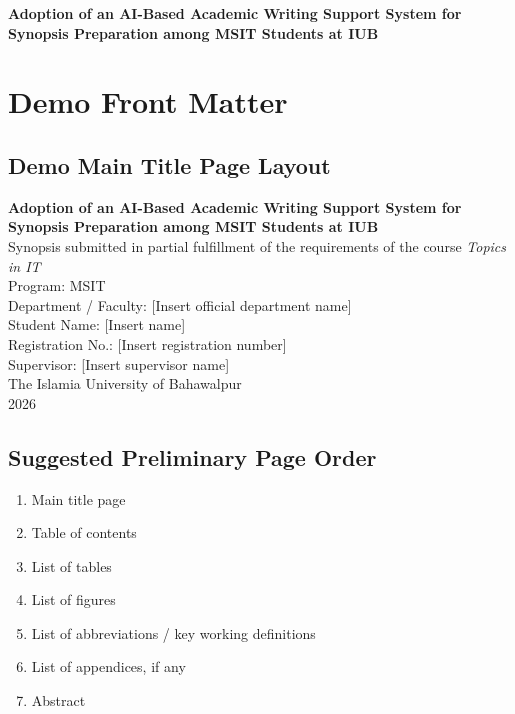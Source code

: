 \documentclass[11pt,a4paper]{article}
\begin{document}
\begin{examplebox}
\textbf{Adoption of an AI-Based Academic Writing Support System for Synopsis Preparation among MSIT Students at IUB}
\end{examplebox}

\section{Demo Front Matter}

\subsection{Demo Main Title Page Layout}

\begin{center}
\begin{tcolorbox}[colback=white,colframe=primary,width=0.88\textwidth,arc=2pt,boxrule=0.8pt]
\begin{center}
{\Large\bfseries Adoption of an AI-Based Academic Writing Support System for Synopsis Preparation among MSIT Students at IUB}\\[12pt]
Synopsis submitted in partial fulfillment of the requirements of the course \emph{Topics in IT}\\[10pt]
Program: MSIT\\
Department / Faculty: [Insert official department name]\\[10pt]
Student Name: [Insert name]\\
Registration No.: [Insert registration number]\\[10pt]
Supervisor: [Insert supervisor name]\\[10pt]
The Islamia University of Bahawalpur\\
2026
\end{center}
\end{tcolorbox}
\end{center}

\subsection{Suggested Preliminary Page Order}

\begin{enumerate}[leftmargin=*]
  \item Main title page
  \item Table of contents
  \item List of tables
  \item List of figures
  \item List of abbreviations / key working definitions
  \item List of appendices, if any
  \item Abstract
\end{enumerate}
\end{document}
